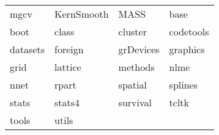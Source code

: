 \begin{tabular}{llll} 
mgcv & KernSmooth & MASS & base\\ 
boot & class & cluster & codetools\\ 
datasets & foreign & grDevices & graphics\\ 
grid & lattice & methods & nlme\\ 
nnet & rpart & spatial & splines\\ 
stats & stats4 & survival & tcltk\\ 
tools  &  utils  &   &   \\ 
\end{tabular}
